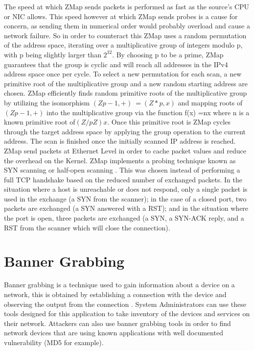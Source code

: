\documentclass[a4wide,leqno,12pt]{report}
\begin{document}
The speed at which ZMap sends packets is performed as fast as the source's CPU or NIC allows. This speed however at which ZMap sends probes is a cause for concern, as sending them in numerical order would probably overload and cause a network failure. So in order to counteract this ZMap uses a random permutation of the address space, iterating over a multiplicative group of integers modulo p, with p being slightly larger than $2^{32}$. By choosing p to be a prime, ZMap guarantees that the group is cyclic and
will reach all addresses in the IPv4 address space once per cycle. To select a new permutation for each scan, a new primitive root of the multiplicative group and a new random starting address are chosen. ZMap efficiently finds random primitive roots of
the  multiplicative  group  by  utilizing  the  isomorphism $(Zp - 1,+)~=(Z*p,x)$ and  mapping  roots of$(Zp-1,+)$ into the multiplicative group via the  function f(x) =nx where n is a known primitive root of$(Z/pZ)x$. Once this primitive root is ZMap cycles through the target address space by applying the group operation to the current address. The scan is finished once the initially scanned IP address is reached\cite{durumeric2013zmap}.\\

ZMap send packets at Ethernet Level in order to cache packet values and reduce the overhead on the Kernel.
ZMap implements a probing technique known as
SYN scanning or half-open scanning \cite{durumeric2013zmap}. This was chosen instead of performing a full TCP handshake
based on the reduced number of exchanged packets. In
the situation where a host is unreachable or does
not respond, only a single packet is used in the exchange (a SYN from
the scanner); in the case of a closed port, two packets
are exchanged (a SYN answered with a RST); and in the
situation where the port is open, three packets are
exchanged (a SYN, a SYN-ACK reply, and a RST from
the scanner which will close the connection)\cite{durumeric2013zmap}.


\section{Banner Grabbing}
Banner grabbing is a technique used to gain information about a device on a network, this is obtained by establishing a connection with the device and observing the output from the connection \cite{kondo2014penetration}. System Administrators can use these tools designed for this application to take inventory of the devices and services on their network. Attackers can also use banner grabbing tools in order to find network devices that are using known applications with well documented vulnerability (MD5 for example).
\end{document}
